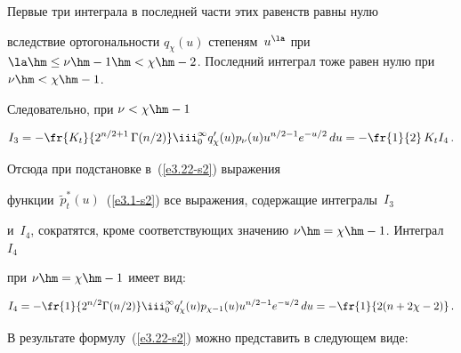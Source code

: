 Первые три интеграла в последней части этих равенств равны нулю

вследствие ортогональности $q_\chi (u)$ степеням~$u^\la$ при $\la \hm\le

\nu\hm-1 \hm<\chi \hm-2$. Последний интеграл  тоже равен нулю при $\nu\hm<\chi \hm-1$.



Следовательно, при $\nu< \chi\hm-1$



\noindent

\begin{equation*}

I_3 =-\fr{K_t}{2^{n/2+1}\, \Gamma (n/2)} \iii_{0}^\infty 

q_\chi' (u) p_\nu (u) u^{n/2-1} e^{-u/2} \, du= -\fr{1}{2}\,K_tI_4\,.


\end{equation*}

Отсюда при подстановке в~(\ref{e3.22-s2}) выражения 

функции~$\tilde p_t^*(u)$~(\ref{e3.1-s2}) все выражения, содержащие интегралы~$I_3$ 

и~$I_4$, сократятся, кроме соответствующих значению $\nu\hm= \chi\hm-1$. Интеграл~$I_4$ 

при $\nu\hm=\chi\hm-1$ имеет вид:

\begin{equation*}

I_4 =-\fr{1}{2^{n/2}

    \Gamma (n/2)} \iii_{0}^\infty q_\chi' (u) p_{\chi-1} (u) u^{n/2-1}

    e^{-u/2} \,du= -\fr{1}{2 (n+2\chi-2)}\,.


    \end{equation*}

В результате формулу~(\ref{e3.22-s2}) можно представить в следующем виде:

